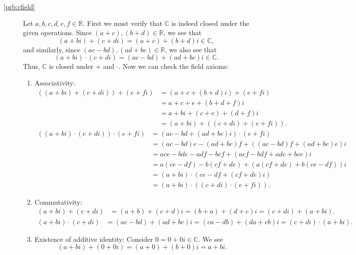 \begin{description}
\item[\ref{prb:cfield}] Let $ a,b,c,d,e,f\in\mathbb{R} $. First we must verify that $ \mathbb{C} $ is indeed closed under the given operations. Since $ (a+c),(b+d)\in\mathbb{R} $, we see that
\begin{equation*}
    (a+bi)+(c+di)=(a+c)+(b+d)i\in\mathbb{C},
\end{equation*}
and similarly, since $ (ac-bd),(ad+bc)\in\mathbb{R} $, we also see that
\begin{equation*}
    (a+bi)\cdot(c+di)=(ac-bd)+(ad+bc)i\in\mathbb{C}.
\end{equation*}
Thus, $ \mathbb{C} $ is closed under $ + $ and $ \cdot $. Now we can check the field axioms:
\begin{enumerate}
    \item Associativity:
    \begin{align*}
        ((a+bi)+(c+di))+(e+fi) &= (a+c+(b+d)i)+(e+fi) \\
        &= a+c+e+(b+d+f)i \\
        &= a+bi+(c+e)+(d+f)i \\
        &= (a+bi)+((c+di)+(e+fi)).
    \end{align*}
    \begin{align*}
        ((a+bi)\cdot(c+di))\cdot(e+fi) &= (ac-bd+(ad+bc)i)\cdot(e+fi) \\
        &= (ac-bd)e-(ad+bc)f+((ac-bd)f+(ad+bc)e)i \\
        &= ace-bde-adf-bcf+(acf-bdf+ade+bce)i \\
        &= a(ce-df)-b(cf+de)+(a(cf+de)+b(ce-df))i \\
        &= (a+bi)\cdot(ce-df+(cf+de)i) \\
        &= (a+bi)\cdot((c+di)\cdot(e+fi)).
    \end{align*}

    \item Commutativity:
    \begin{align*}
        (a+bi)+(c+di) &= (a+b)+(c+d)i=(b+a)+(d+c)i=(c+di)+(a+bi).
    \end{align*}
    \begin{align*}
        (a+bi)\cdot(c+di) &= (ac-bd)+(ad+bc)i=(ca-db)+(da+cb)i=(c+di)\cdot(a+bi).
    \end{align*}

    \item Existence of additive identity: Consider $ 0=0+0i\in\mathbb{C} $. We see
    \begin{equation*}
        (a+bi)+(0+0i)=(a+0)+(b+0)i=a+bi.
    \end{equation*}


\end{enumerate}
\end{description}
